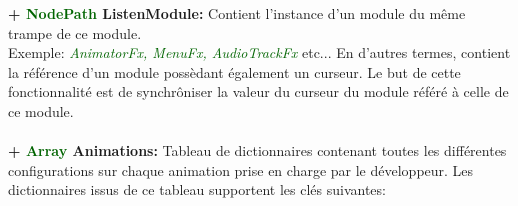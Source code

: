\documentclass[a4paper, 11pt]{article}
\begin{document}
	\textbf{+ \textcolor{darkgreen}{NodePath} ListenModule:} Contient l'instance d'un module du même trampe
	de ce module. \\Exemple: \textit{\textcolor{darkgreen}{AnimatorFx, MenuFx, AudioTrackFx}} etc... En
	d'autres termes, contient la référence d'un module possèdant également un curseur. Le but de cette
	fonctionnalité est de synchrôniser la valeur du curseur du module référé à celle de ce module.\\\\
	\textbf{+ \textcolor{darkgreen}{Array} Animations:} Tableau de dictionnaires contenant toutes les 
	différentes configurations sur chaque animation prise en charge par le développeur. Les dictionnaires 
	issus de ce tableau supportent les clés suivantes:\\
\end{document}
